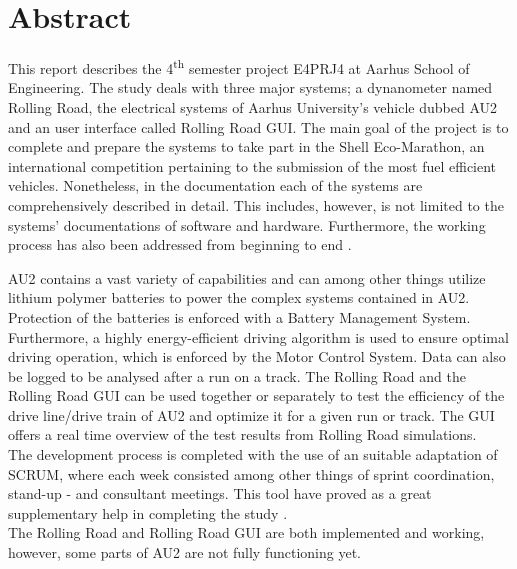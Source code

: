 \chapter{Abstract}

This report describes the 4\textsuperscript{th} semester project E4PRJ4 at Aarhus School of Engineering. The study deals with three major systems; a dynanometer named Rolling Road, the electrical systems of Aarhus University's vehicle dubbed AU2 and an user interface called Rolling Road GUI. The main goal of the project is to complete and prepare the systems to take part in the Shell Eco-Marathon, an international competition pertaining to the submission of the most fuel efficient vehicles. Nonetheless, in the documentation each of the systems are comprehensively described in detail. This includes, however, is not limited to the systems' documentations of software and hardware. Furthermore, the working process has also been addressed from beginning to end . 

AU2 contains a vast variety of capabilities and can among other things utilize lithium polymer batteries to power the complex systems contained in AU2.
Protection of the batteries is enforced with a Battery Management System. Furthermore, a highly energy-efficient driving algorithm is used to ensure optimal driving operation, which is enforced by the Motor Control System. Data can also be logged to be analysed after a run on a track.
The Rolling Road and the Rolling Road GUI can be used together or separately to test the efficiency of the drive line/drive train of AU2 and optimize it for a given run or track. The GUI offers a real time overview of the test results from Rolling Road simulations.\\

The development process is completed with the use of an suitable adaptation of SCRUM, where each week consisted among other things of sprint coordination, stand-up - and consultant meetings. This tool have proved as a great
supplementary help in completing the study .\\
The Rolling Road and Rolling Road GUI are both implemented and working, however, some parts of AU2 are not fully functioning yet.